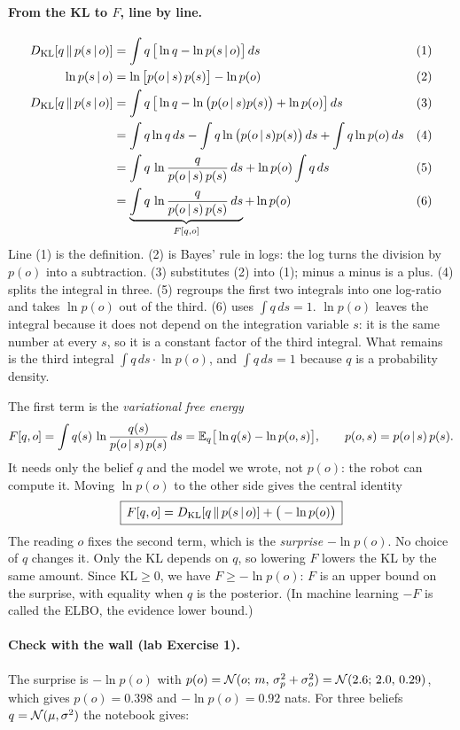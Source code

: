 \documentclass[11pt]{article}
\begin{document}
\paragraph{From the KL to $F$, line by line.}
\begin{align*}
D_{\mathrm{KL}}\!\left[q\,\middle\|\,p(s\,|\, o)\right] &= \int q\,\big[\ln q - \ln p(s\,|\, o)\big]\,ds && (1)\\
\ln p(s\,|\, o) &= \ln\big[p(o\,|\, s)\,p(s)\big] - \ln p(o) && (2)\\
D_{\mathrm{KL}}\!\left[q\,\middle\|\,p(s\,|\, o)\right] &= \int q\,\big[\ln q - \ln\big(p(o\,|\, s)p(s)\big) + \ln p(o)\big]\,ds && (3)\\
&= \int q\ln q\,ds - \int q\ln\big(p(o\,|\, s)p(s)\big)\,ds + \int q\ln p(o)\,ds && (4)\\
&= \int q\,\ln\frac{q}{p(o\,|\, s)\,p(s)}\,ds + \ln p(o)\int q\,ds && (5)\\
&= \underbrace{\int q\,\ln\frac{q}{p(o\,|\, s)\,p(s)}\,ds}_{F[q,o]} + \ln p(o) && (6)
\end{align*}
Line (1) is the definition. (2) is Bayes' rule in logs: the log turns the division by $p(o)$ into a subtraction. (3) substitutes (2) into (1); minus a minus is a plus. (4) splits the integral in three. (5) regroups the first two integrals into one log-ratio and takes $\ln p(o)$ out of the third. (6) uses $\int q\,ds = 1$.
$\ln p(o)$ leaves the integral because it does not depend on the integration variable $s$: it is the same number at every $s$, so it is a constant factor of the third integral. What remains is the third integral $\int q\,ds\cdot\ln p(o)$, and $\int q\,ds = 1$ because $q$ is a probability density.

The first term is the \emph{variational free energy}
\[
F[q,o] = \int q(s)\,\ln\frac{q(s)}{p(o\,|\, s)\,p(s)}\,ds = \mathbb{E}_q\big[\ln q(s) - \ln p(o,s)\big],\qquad p(o,s) = p(o\,|\, s)\,p(s).
\]
It needs only the belief $q$ and the model we wrote, not $p(o)$: the robot can compute it. Moving $\ln p(o)$ to the other side gives the central identity
\[
\boxed{\,F[q,o] = D_{\mathrm{KL}}\!\left[q\,\middle\|\,p(s\,|\, o)\right] + \big(-\ln p(o)\big)\,}
\]
The reading $o$ fixes the second term, which is the \emph{surprise} $-\ln p(o)$. No choice of $q$ changes it. Only the KL depends on $q$, so lowering $F$ lowers the KL by the same amount. Since $\mathrm{KL} \ge 0$, we have $F \ge -\ln p(o)$: $F$ is an upper bound on the surprise, with equality when $q$ is the posterior. (In machine learning $-F$ is called the ELBO, the evidence lower bound.)

\paragraph{Check with the wall (lab Exercise 1).} The surprise is $-\ln p(o)$ with $p(o) = \mathcal{N}(o;\, m,\, \sigma_p^2+\sigma_o^2) = \mathcal{N}(2.6;\, 2.0,\, 0.29)$, which gives $p(o) = 0.398$ and $-\ln p(o) = 0.92$ nats. For three beliefs $q = \mathcal{N}(\mu,\sigma^2)$ the notebook gives:
\end{document}

